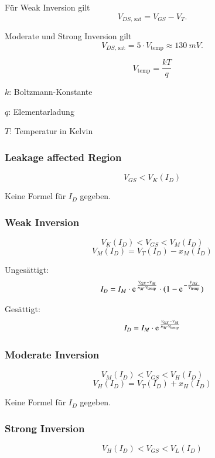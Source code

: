 Für Weak Inversion gilt
\[\boxed{V_{DS\text{, sat}} = V_{GS}-V_T}.\]

Moderate und Strong Inversion gilt
\[\boxed{V_{DS\text{, sat}} = 5 \cdot V_\text{temp} \approx \qty{130}{mV}}.\]

\[V_\text{temp} = \frac{kT}{q}\]

$k$: Boltzmann-Konstante

$q$: Elementarladung

$T$: Temperatur in Kelvin


\subsubsection{Leakage affected Region}
\begin{center}
    \[\boxed{V_{GS} < V_K(I_D)}\]
\end{center}

Keine Formel für $I_D$ gegeben.

\subsubsection{Weak Inversion}
\[\boxed{V_K(I_D) < V_{GS} < V_M(I_D)}\]
\[ V_M(I_D) = V_T(I_D) - x_M(I_D) \]
\medskip

\begin{minipage}{0.48\columnwidth}
    Ungesättigt:
    \[I_D = I_M \cdot \e^{\frac{V_{GS} - V_M}{n_M \cdot V_\text{temp}}} \cdot (1 - \e^{-\frac{V_{DS}}{V_\text{temp}}})\]
\end{minipage}
\hfill
\begin{minipage}{0.48\columnwidth}
    Gesättigt:
    \[I_D = I_M \cdot \e^{\frac{V_{GS} - V_M}{n_M \cdot V_\text{temp}}}\]
\end{minipage}

\subsubsection{Moderate Inversion}
\begin{center}
    \[\boxed{V_M(I_D) < V_{GS} < V_H(I_D)}\]
    \[ V_H(I_D) = V_T(I_D) + x_H(I_D) \]
\end{center}

Keine Formel für $I_D$ gegeben.

\subsubsection{Strong Inversion}
\begin{center}
    \[\boxed{V_H(I_D) < V_{GS} < V_L(I_D)}\]
\end{center}

